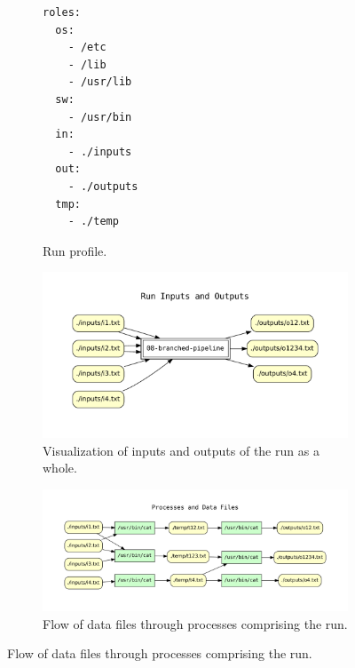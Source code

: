 \begin{figure}[th]
        \centering
\begin{subfigure}[b]{0.20\linewidth}
\begin{verbatim}
roles:
  os:
    - /etc
    - /lib
    - /usr/lib
  sw:
    - /usr/bin
  in:
    - ./inputs
  out:
    - ./outputs
  tmp:
    - ./temp
\end{verbatim}
            \caption{Run profile.}
        \end{subfigure}
\hfill
        \begin{subfigure}[b]{0.69\linewidth}
            \includegraphics[width=\linewidth]{cpr_run_inputs_outputs.pdf}
            \caption{Visualization of inputs and outputs of the run as a whole.}
        \end{subfigure} 

\vspace*{1em}

    \begin{subfigure}[b]{1.0\linewidth}
        \includegraphics[width=\linewidth]{cpr_processes_and_data_files.pdf}
        \caption{Flow of data files through processes comprising the run.}
    \end{subfigure}
    \label{fig:cpr-example}
\end{figure}





